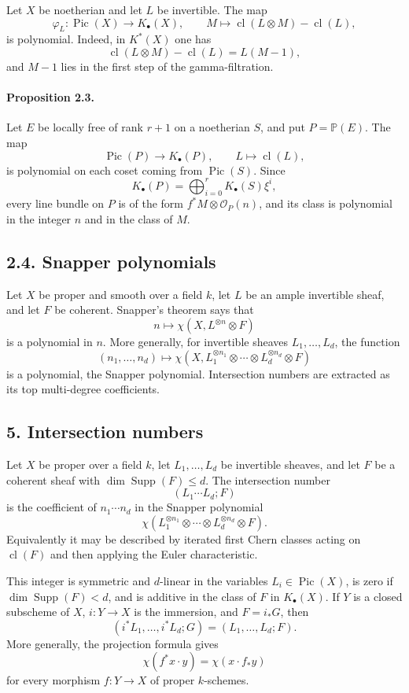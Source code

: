 \documentclass[12pt]{article}
\newcommand{\bP}{\mathbb P}
\newcommand{\cO}{\mathcal O}
\newcommand{\Pic}{\operatorname{Pic}}
\newcommand{\Supp}{\operatorname{Supp}}
\newcommand{\cl}{\operatorname{cl}}
\newcommand{\longto}{\longrightarrow}
\begin{document}
Let $X$ be noetherian and let $L$ be invertible. The map
\[
\varphi_L:\Pic(X)\longto K_\bullet(X),\qquad
M\longmapsto \cl(L\otimes M)-\cl(L),
\]
is polynomial. Indeed, in $K^*(X)$ one has
\[
\cl(L\otimes M)-\cl(L)=L(M-1),
\]
and $M-1$ lies in the first step of the gamma-filtration.

\paragraph{Proposition 2.3.}
Let $E$ be locally free of rank $r+1$ on a noetherian $S$, and put $P=\bP(E)$. The map
\[
\Pic(P)\longto K_\bullet(P),\qquad L\longmapsto \cl(L),
\]
is polynomial on each coset coming from $\Pic(S)$. Since
\[
K_\bullet(P)=\bigoplus_{i=0}^r K_\bullet(S)\xi^i,
\]
every line bundle on $P$ is of the form $f^*M\otimes\cO_P(n)$, and its class is polynomial in the integer $n$ and in the class of $M$.

\subsection*{2.4. Snapper polynomials}

Let $X$ be proper and smooth over a field $k$, let $L$ be an ample invertible sheaf, and let $F$ be coherent. Snapper's theorem says that
\[
n\longmapsto \chi(X,L^{\otimes n}\otimes F)
\]
is a polynomial in $n$. More generally, for invertible sheaves $L_1,\ldots,L_d$, the function
\[
(n_1,\ldots,n_d)\longmapsto
\chi(X,L_1^{\otimes n_1}\otimes\cdots\otimes L_d^{\otimes n_d}\otimes F)
\]
is a polynomial, the Snapper polynomial. Intersection numbers are extracted as its top multi-degree coefficients.

\subsection*{5. Intersection numbers}

Let $X$ be proper over a field $k$, let $L_1,\ldots,L_d$ be invertible sheaves, and let $F$ be a coherent sheaf with $\dim\Supp(F)\leq d$. The intersection number
\[
(L_1\cdots L_d;F)
\]
is the coefficient of $n_1\cdots n_d$ in the Snapper polynomial
\[
\chi(L_1^{\otimes n_1}\otimes\cdots\otimes L_d^{\otimes n_d}\otimes F).
\]
Equivalently it may be described by iterated first Chern classes acting on $\cl(F)$ and then applying the Euler characteristic.

This integer is symmetric and $d$-linear in the variables $L_i\in\Pic(X)$, is zero if $\dim\Supp(F)<d$, and is additive in the class of $F$ in $K_\bullet(X)$. If $Y$ is a closed subscheme of $X$, $i:Y\to X$ is the immersion, and $F=i_*G$, then
\[
(i^*L_1,\ldots,i^*L_d;G)=(L_1,\ldots,L_d;F).
\]
More generally, the projection formula gives
\[
\chi(f^*x\cdot y)=\chi(x\cdot f_*y)
\]
for every morphism $f:Y\to X$ of proper $k$-schemes.
\end{document}
